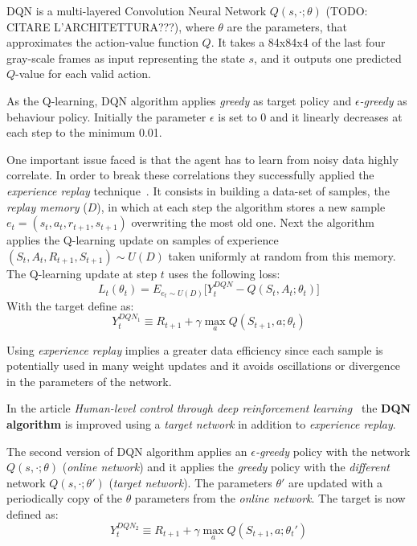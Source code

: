 DQN is a multi-layered Convolution Neural Network $Q(s, \cdotp; \theta)$ (TODO: CITARE L'ARCHITETTURA???), where $\theta$ are the parameters, that approximates the action-value function $Q$. It takes a 84x84x4 of the last four gray-scale frames as input representing the state $s$, and it outputs one predicted $Q$-value for each valid action.  

As the Q-learning, DQN algorithm applies \textit{greedy} as target policy and \textit{$\epsilon$-greedy} as behaviour policy. Initially the parameter $\epsilon$ is set to 0 and it linearly decreases at each step to the minimum 0.01.

One important issue faced is that the agent has to learn from noisy data highly correlate. In order to break these correlations they successfully applied the \textit{experience replay} technique~\cite{Lin:1992:RLR:168871}. It consists in building a data-set of samples, the \textit{replay memory} ($D$), in which at each step the algorithm stores a new sample $e_t = (s_t, a_t, r_{t+1}, s_{t+1})$ overwriting the most old one. Next the algorithm applies the Q-learning update on samples of experience $(S_t, A_t, R_{t+1}, S_{t+1}) \sim U(D)$ taken uniformly at random from this memory. The Q-learning update at step $t$ uses the following loss:
\begin{equation}
	L_t(\theta_t) = E_{e_t \sim U(D)} %
		\Big[ Y^{DQN}_t - Q(S_t, A_t;\theta_t) \Big]
\end{equation}
With the target define as:
\begin{equation}
Y^{DQN_1}_t \equiv R_{t+1} + \gamma \max_{a} Q(S_{t+1}, a; \theta_t)
\end{equation}

Using \textit{experience replay} implies a greater data efficiency since each sample is potentially used in many weight updates and it avoids oscillations or divergence in the parameters of the network.


In the article \textit{Human-level control through deep reinforcement learning}~\cite{Mnih2015} the \textbf{DQN algorithm} is improved using a \textit{target network} in addition to \textit{experience replay}.

The second version of DQN algorithm applies an \textit{$\epsilon$-greedy} policy with the network $Q(s, \cdotp; \theta)$ (\textit{online network}) and it applies the \textit{greedy} policy with the \emph{different} network $Q(s, \cdotp; \theta')$ (\textit{target network}). The parameters $\theta'$ are updated with a periodically copy of the $\theta$ parameters from the \textit{online network}. The target is now defined as:
\begin{equation}
Y^{DQN_2}_t \equiv R_{t+1} + \gamma \max_{a} Q(S_{t+1}, a; \theta_t')
\end{equation}

